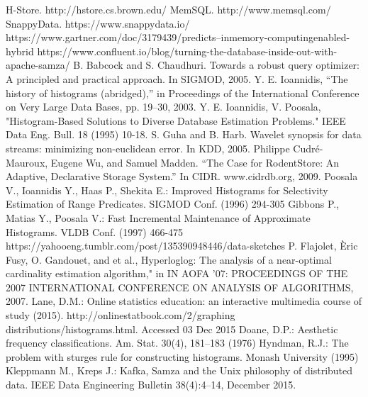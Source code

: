 \documentclass[10pt, conference, compsocconf]{IEEEtran}
\begin{document}
\begin{thebibliography}{1}
H-Store. http://hstore.cs.brown.edu/
MemSQL. http://www.memsql.com/
SnappyData. https://www.snappydata.io/
https://www.gartner.com/doc/3179439/predicts--inmemory-computingenabled-hybrid
https://www.confluent.io/blog/turning-the-database-inside-out-with-apache-samza/
B. Babcock and S. Chaudhuri. Towards a robust query optimizer: A principled and practical approach. In SIGMOD, 2005.
Y. E. Ioannidis, “The history of histograms (abridged),” in Proceedings of the International Conference on Very Large Data Bases, pp. 19–30, 2003.
Y. E. Ioannidis, V. Poosala, "Histogram-Based Solutions to
Diverse Database Estimation Problems." IEEE Data Eng. Bull. 18 (1995) 10-18.
S. Guha and B. Harb. Wavelet synopsis for data streams: minimizing non-euclidean error. In KDD, 2005.
Philippe Cudré-Mauroux, Eugene Wu, and Samuel Madden. “The Case for RodentStore: An Adaptive, Declarative Storage System.” In CIDR. www.cidrdb.org, 2009.
Poosala V., Ioannidis Y., Haas P., Shekita E.: Improved Histograms for Selectivity Estimation of Range Predicates. SIGMOD Conf. (1996) 294-305
Gibbons P., Matias Y., Poosala V.: Fast Incremental Maintenance of Approximate Histograms. VLDB Conf. (1997) 466-475
https://yahooeng.tumblr.com/post/135390948446/data-sketches
P. Flajolet, \`{E}ric Fusy, O. Gandouet, and et al., Hyperloglog: The analysis of a near-optimal cardinality estimation algorithm," in IN AOFA '07: PROCEEDINGS OF THE 2007 INTERNATIONAL CONFERENCE ON ANALYSIS OF ALGORITHMS, 2007.
Lane, D.M.: Online statistics education: an interactive multimedia course of study (2015). http://onlinestatbook.com/2/graphing distributions/histograms.html. Accessed 03 Dec 2015
Doane, D.P.: Aesthetic frequency classifications. Am. Stat. 30(4), 181–183 (1976)
Hyndman, R.J.: The problem with sturges rule for constructing histograms. Monash University (1995)
Kleppmann M., Kreps J.: Kafka, Samza and the Unix philosophy of distributed data. IEEE Data Engineering Bulletin 38(4):4–14, December 2015.
\end{thebibliography}
\end{document}
